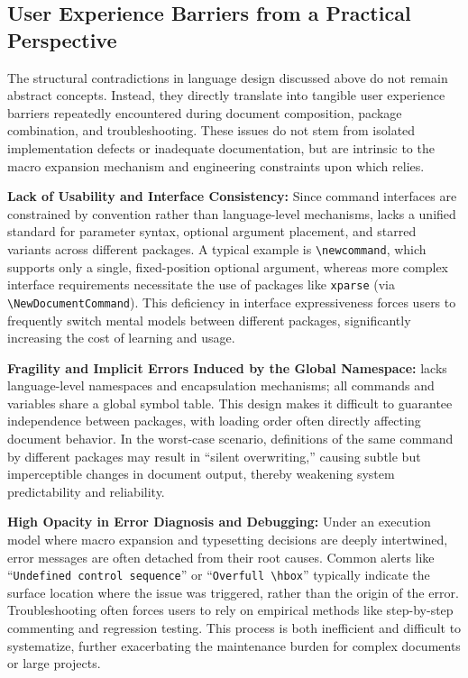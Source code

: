 \subsection{User Experience Barriers from a Practical Perspective}

The structural contradictions in language design discussed above do not remain abstract concepts. Instead, they directly translate into tangible user experience barriers repeatedly encountered during document composition, package combination, and troubleshooting. These issues do not stem from isolated implementation defects or inadequate documentation, but are intrinsic to the macro expansion mechanism and engineering constraints upon which \LaTeXe{} relies.

\textbf{Lack of Usability and Interface Consistency:} Since command interfaces are constrained by convention rather than language-level mechanisms, \LaTeXe{} lacks a unified standard for parameter syntax, optional argument placement, and starred variants across different packages. A typical example is \verb|\newcommand|, which supports only a single, fixed-position optional argument, whereas more complex interface requirements necessitate the use of packages like \texttt{xparse} (via \verb|\NewDocumentCommand|). This deficiency in interface expressiveness forces users to frequently switch mental models between different packages, significantly increasing the cost of learning and usage.

\textbf{Fragility and Implicit Errors Induced by the Global Namespace:} \LaTeXe{} lacks language-level namespaces and encapsulation mechanisms; all commands and variables share a global symbol table. This design makes it difficult to guarantee independence between packages, with loading order often directly affecting document behavior. In the worst-case scenario, definitions of the same command by different packages may result in ``silent overwriting,'' causing subtle but imperceptible changes in document output, thereby weakening system predictability and reliability.

\textbf{High Opacity in Error Diagnosis and Debugging:} Under an execution model where macro expansion and typesetting decisions are deeply intertwined, error messages are often detached from their root causes. Common alerts like ``\verb|Undefined control sequence|'' or ``\verb|Overfull \hbox|'' typically indicate the surface location where the issue was triggered, rather than the origin of the error. Troubleshooting often forces users to rely on empirical methods like step-by-step commenting and regression testing. This process is both inefficient and difficult to systematize, further exacerbating the maintenance burden for complex documents or large projects.

